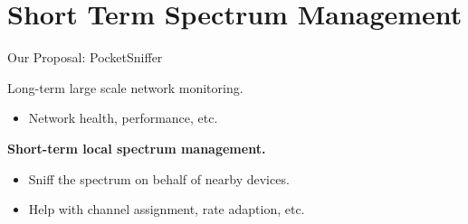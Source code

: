 \section{Short Term Spectrum Management}

\begin{frame}{Our Proposal: PocketSniffer}
  \begin{figure}
    \centering
  \end{figure}
  {%
    \color{gray}
    Long-term large scale network monitoring.
    \begin{itemize}
      \item \color{gray} Network health, performance, etc.
    \end{itemize}
  }
  \textbf{Short-term local spectrum management.}
  \begin{itemize}
    \item Sniff the spectrum on behalf of nearby devices.
    \item Help with channel assignment, rate adaption, etc.
  \end{itemize}
\end{frame}

